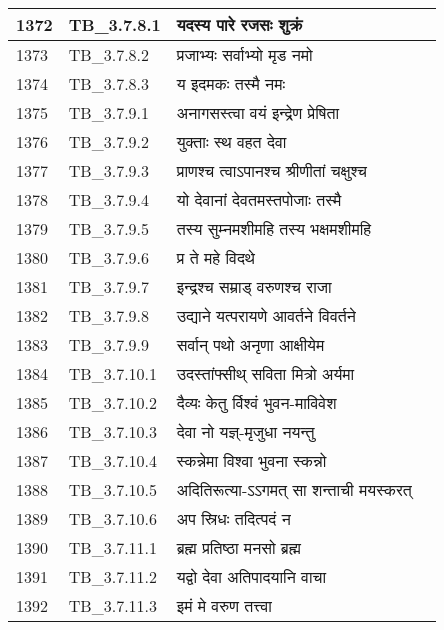 \documentclass[17pt]{extarticle}
\begin{document}
\begin{longtable}{||p{0.4in}||p{0.9in}||p{4.0in}||p{0.9in}||}
        \hline
            1372 & TB\_3.7.8.1 & यदस्य पारे रजसः शुक्रं &      \\
        \hline
            1373 & TB\_3.7.8.2 & प्रजाभ्यः सर्वाभ्यो मृड नमो &      \\
        \hline
            1374 & TB\_3.7.8.3 & य इदमकः तस्मै नमः &      \\
        \hline
            1375 & TB\_3.7.9.1 & अनागसस्त्वा वयं इन्द्रेण प्रेषिता &      \\
        \hline
            1376 & TB\_3.7.9.2 & युक्ताः स्थ वहत देवा &      \\
        \hline
            1377 & TB\_3.7.9.3 & प्राणश्च त्वाऽपानश्च श्रीणीतां चक्षुश्च &      \\
        \hline
            1378 & TB\_3.7.9.4 & यो देवानां देवतमस्तपोजाः तस्मै &      \\
        \hline
            1379 & TB\_3.7.9.5 & तस्य सुम्नमशीमहि तस्य भक्षमशीमहि &      \\
        \hline
            1380 & TB\_3.7.9.6 & प्र ते महे विदथे &      \\
        \hline
            1381 & TB\_3.7.9.7 & इन्द्रश्च सम्राड् वरुणश्च राजा &      \\
        \hline
            1382 & TB\_3.7.9.8 & उद्याने यत्परायणे आवर्तने विवर्तने &      \\
        \hline
            1383 & TB\_3.7.9.9 & सर्वान् पथो अनृणा आक्षीयेम &      \\
        \hline
            1384 & TB\_3.7.10.1 & उदस्तांफ्सीथ् सविता मित्रो अर्यमा &      \\
        \hline
            1385 & TB\_3.7.10.2 & दैव्यः केतु र्विश्वं भुवन{-}माविवेश &      \\
        \hline
            1386 & TB\_3.7.10.3 & देवा नो यज्ञ्{-}मृजुधा नयन्तु &      \\
        \hline
            1387 & TB\_3.7.10.4 & स्कन्नेमा विश्वा भुवना स्कन्नो &      \\
        \hline
            1388 & TB\_3.7.10.5 & अदितिरूत्या{-}ऽऽगमत् सा शन्ताची मयस्करत् &      \\
        \hline
            1389 & TB\_3.7.10.6 & अप स्रिधः तदित्पदं न &      \\
        \hline
            1390 & TB\_3.7.11.1 & ब्रह्म प्रतिष्ठा मनसो ब्रह्म &      \\
        \hline
            1391 & TB\_3.7.11.2 & यद्वो देवा अतिपादयानि वाचा &      \\
        \hline
            1392 & TB\_3.7.11.3 & इमं मे वरुण तत्त्वा &      \\

\end{longtable}
\end{document}
